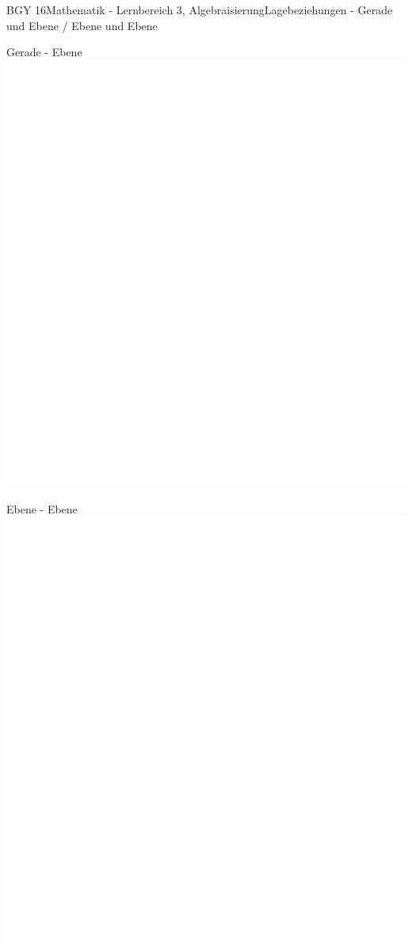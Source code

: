 \documentclass[oneside,openany,headings=optiontotoc,11pt,numbers=noenddot]{scrreprt}
\begin{document}
\begin{worksheet}{BGY 16}{Mathematik - Lernbereich 3, Algebraisierung}{Lagebeziehungen - Gerade und Ebene / Ebene und Ebene}
\begin{framed}
		\end{framed}
		\newpage
		\begin{framed}
			\tiny{\color{codegray}Gerade - Ebene}\\
			\includegraphics[scale=0.73]{../empty.jpg}
		\end{framed}
		\begin{framed}
			\tiny{\color{codegray}Ebene - Ebene}\\
			\includegraphics[scale=0.73]{../empty.jpg}
		\end{framed}
	\end{worksheet}
\end{document}
